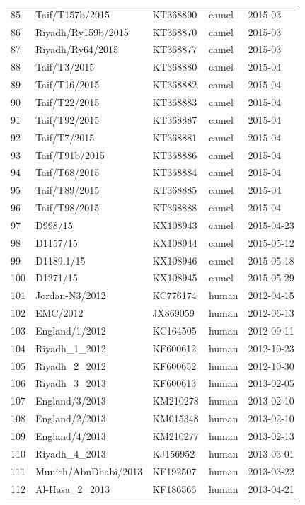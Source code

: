 \documentclass[11pt,oneside,letterpaper]{article}
\begin{document}
\begin{longtable}{ | l | l | l | l | l | }
  85 & Taif/T157b/2015 & KT368890 & camel & 2015-03 \\
  86 & Riyadh/Ry159b/2015 & KT368870 & camel & 2015-03 \\
  87 & Riyadh/Ry64/2015 & KT368877 & camel & 2015-03 \\
  88 & Taif/T3/2015 & KT368880 & camel & 2015-04 \\
  89 & Taif/T16/2015 & KT368882 & camel & 2015-04 \\
  90 & Taif/T22/2015 & KT368883 & camel & 2015-04 \\
  91 & Taif/T92/2015 & KT368887 & camel & 2015-04 \\
  92 & Taif/T7/2015 & KT368881 & camel & 2015-04 \\
  93 & Taif/T91b/2015 & KT368886 & camel & 2015-04 \\
  94 & Taif/T68/2015 & KT368884 & camel & 2015-04 \\
  95 & Taif/T89/2015 & KT368885 & camel & 2015-04 \\
  96 & Taif/T98/2015 & KT368888 & camel & 2015-04 \\
  97 & D998/15 & KX108943 & camel & 2015-04-23 \\
  98 & D1157/15 & KX108944 & camel & 2015-05-12 \\
  99 & D1189.1/15 & KX108946 & camel & 2015-05-18 \\
  100 & D1271/15 & KX108945 & camel & 2015-05-29 \\
  101 & Jordan-N3/2012 & KC776174 & human & 2012-04-15 \\
  102 & EMC/2012 & JX869059 & human & 2012-06-13 \\
  103 & England/1/2012 & KC164505 & human & 2012-09-11 \\
  104 & Riyadh\_1\_2012 & KF600612 & human & 2012-10-23 \\
  105 & Riyadh\_2\_2012 & KF600652 & human & 2012-10-30 \\
  106 & Riyadh\_3\_2013 & KF600613 & human & 2013-02-05 \\
  107 & England/3/2013 & KM210278 & human & 2013-02-10 \\
  108 & England/2/2013 & KM015348 & human & 2013-02-10 \\
  109 & England/4/2013 & KM210277 & human & 2013-02-13 \\
  110 & Riyadh\_4\_2013 & KJ156952 & human & 2013-03-01 \\
  111 & Munich/AbuDhabi/2013 & KF192507 & human & 2013-03-22 \\
  112 & Al-Hasa\_2\_2013 & KF186566 & human & 2013-04-21 \\

\end{longtable}
\end{document}
